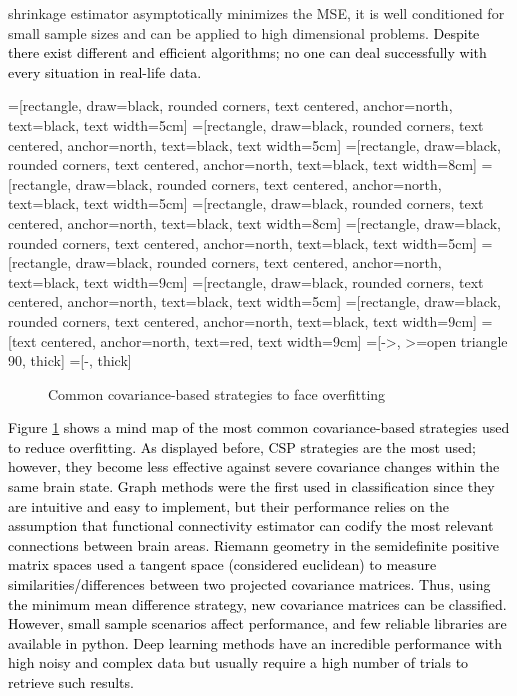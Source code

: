 shrinkage estimator asymptotically minimizes the MSE, it is well conditioned for small sample sizes and can be applied to high dimensional problems. \textcolor{black}{Despite there exist different and efficient algorithms; no one can deal successfully with every situation in real-life data.}


=[rectangle, draw=black, rounded corners,
        text centered, anchor=north, text=black, text width=5cm]
=[rectangle, draw=black, rounded corners, 
        text centered, anchor=north, text=black, text width=5cm]
=[rectangle, draw=black, rounded corners, 
        text centered, anchor=north, text=black, text width=8cm]
=[rectangle, draw=black, rounded corners, 
        text centered, anchor=north, text=black, text width=5cm]
=[rectangle, draw=black, rounded corners, 
text centered, anchor=north, text=black, text width=8cm]
=[rectangle, draw=black, rounded corners,
        text centered, anchor=north, text=black, text width=5cm]
=[rectangle, draw=black, rounded corners, 
        text centered, anchor=north, text=black, text width=9cm]
=[rectangle, draw=black, rounded corners,
        text centered, anchor=north, text=black, text width=5cm]
=[rectangle, draw=black, rounded corners, 
        text centered, anchor=north, text=black, text width=9cm]
=[text centered, anchor=north, text=red, text width=9cm]
=[->, >=open triangle 90, thick]
=[-, thick]

\begin{figure}
\centering
  \scalebox{0.5}{%

}
\caption{Common covariance-based strategies to face overfitting}\label{fig1covar}
\end{figure}

\textcolor{black}{Figure \ref{fig1covar} shows a mind map of the most common covariance-based strategies used to reduce overfitting. As displayed before, CSP strategies are the most used; however, they become less effective against severe covariance changes within the same brain state. Graph methods were the first used in classification since they are intuitive and easy to implement, but their performance relies on the assumption that functional connectivity estimator can codify the most relevant connections between brain areas. Riemann geometry in the semidefinite positive matrix spaces used a tangent space (considered euclidean) to measure similarities/differences between two projected covariance matrices. Thus, using the minimum mean difference strategy, new covariance matrices can be classified. However, small sample scenarios affect performance, and few reliable libraries are available in python. Deep learning methods have an incredible performance with high noisy and complex data but usually require a high number of trials to retrieve such results.}

